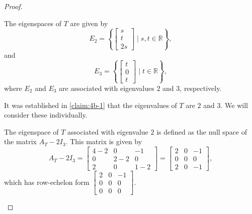 \begin{enumerate}
\begin{enumerate}
\begin{proof}
                    \begin{claim} \label{claim:4b-2}
                        The eigenspaces of $T$ are given by
                        \[
                            E_2 = \left\{
                                \begin{bmatrix}
                                    s \\ t \\ 2 s
                                \end{bmatrix}
                                \; \Big| \; s, t \in \mathbb{R}
                            \right\},
                        \]
                        and
                        \[
                            E_3 = \left\{
                                \begin{bmatrix}
                                    t \\ 0 \\ t
                                \end{bmatrix}
                                \; \Big| \; t \in \mathbb{R}
                            \right\},
                        \]
                        where $E_2$ and $E_3$ are associated with eigenvalues $2$ and $3$, respectively.
                    \end{claim}

                    \begin{subproof}
                        It was established in \cref{claim:4b-1} that the eigenvalues of $T$ are $2$ and $3$.
                        We will consider these individually.

                        The eigenspace of $T$ associated with eigenvalue $2$ is defined as the null space of the matrix $A_T - 2 I_3$. This matrix is given by
                        \[
                            A_T - 2 I_3 =
                            \begin{bmatrix}
                                4 - 2 & 0 & -1 \\
                                0 & 2 - 2 & 0 \\
                                2 & 0 & 1 - 2
                            \end{bmatrix} =
                            \begin{bmatrix}
                                2 & 0 & -1 \\
                                0 & 0 & 0 \\
                                2 & 0 & -1
                            \end{bmatrix},
                        \]
                        which has row-echelon form $
                        \begin{bmatrix}
                            2 & 0 & -1 \\
                            0 & 0 & 0 \\
                            0 & 0 & 0
                        \end{bmatrix}$.


\end{subproof}
\end{proof}
\end{enumerate}
\end{enumerate}
